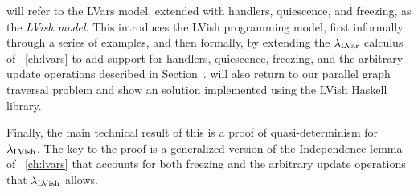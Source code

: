  will refer to the LVars model, extended with handlers, quiescence,
and freezing, as the \emph{LVish model}.  This  introduces
the LVish programming model, first informally through a series of examples, and then formally, by extending
the $\lambda_{\textrm{LVar}}$ calculus of ~\ref{ch:lvars} to add support
for handlers, quiescence, freezing, and the arbitrary update operations described in
Section~\either{\ref{subsection:lvars-generalizing-from-least-upper-bound-writes}}{\ref{s:lvars-generalizing}}.
 will also return to our parallel graph traversal problem and show
an solution implemented using the LVish Haskell library.

Finally, the main technical result of this 
is a proof of quasi-determinism for $\lambda_{\textrm{LVish}}$. The key to the
proof is a generalized version of the Independence lemma
of ~\ref{ch:lvars} that accounts for both
freezing and the arbitrary update operations that $\lambda_{\textrm{LVish}}$
allows.
